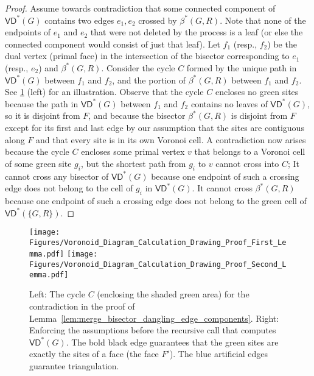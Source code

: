 \documentclass{article}
\newcommand{\VD}{\textsf{VD}}
\begin{document}
\begin{proof}
Assume towards contradiction that some connected component of $\VD^*(G)$ contains two edges $e_1, e_2$ crossed by $\beta^*(G,R)$.
Note that none of the endpoints of $e_1$ and $e_2$ that were not deleted by the process is a leaf (or else the connected component would consist of just that leaf).
Let $f_1$ (resp., $f_2$) be the dual vertex (primal face) in the intersection of the bisector corresponding to $e_1$ (resp., $e_2$) and $\beta^*(G,R)$.
Consider the cycle $C$ formed by the unique path in $\VD^*(G)$ between $f_1$ and $f_2$, and the portion of $\beta^*(G,R)$ between $f_1$ and $f_2$.
See \cref{fig:Voronoid_Diagram_Calculation_Drawing_Proof_First_Lemma} (left) for an illustration.
Observe that the cycle $C$ encloses no green sites because the path in $\VD^*(G)$ between $f_1$ and $f_2$ contains no leaves of $\VD^*(G)$, so it is disjoint from $F$, and because  the bisector $\beta^*(G,R)$ is disjoint from $F$ except for its first and last edge by our assumption that the sites are contiguous along $F$ and that every site is in its own Voronoi cell.
A contradiction now arises because the cycle $C$ encloses some primal vertex $v$ that belongs to a Voronoi cell of some green site $g_i$, but the shortest path from $g_i$ to $v$ cannot cross into $C$; It cannot cross any bisector of $\VD^*(G)$  because one endpoint of such a crossing edge does not belong to the cell of $g_i$ in $\VD^*(G)$.
It cannot cross $\beta^*(G,R)$  because one endpoint of such a crossing edge does not belong to the green cell of $\VD^*(\{G,R\})$.
\end{proof}

\begin{figure}[htb]
     \centering
    \texttt{[image: Figures/Voronoid\_Diagram\_Calculation\_Drawing\_Proof\_First\_Lemma.pdf]}
     \hspace{0.4in}\texttt{[image: Figures/Voronoid\_Diagram\_Calculation\_Drawing\_Proof\_Second\_Lemma.pdf]}
     \caption{Left: The cycle $C$ (enclosing the shaded green area) for the contradiction in the proof of Lemma~\ref{lem:merge_bisector_dangling_edge_components}. Right: Enforcing the assumptions before the recursive call that computes $\VD^*(G)$. The bold black edge guarantees that the green sites are exactly the sites of a face (the face $F'$). The blue artificial edges guarantee triangulation.}
     \label{fig:Voronoid_Diagram_Calculation_Drawing_Proof_First_Lemma}
 \end{figure}
\end{document}
